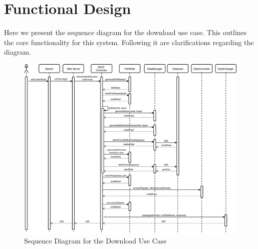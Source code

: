 \documentclass{article}
\begin{document}
\clearpage

\section{Functional Design}

Here we present the sequence diagram for the download use case. This
outlines the core functionality for this system. Following it are 
clarifications regarding the diagram. 

\begin{figure}[H]
	\begin{center}
		\caption{Sequence Diagram for the Download Use Case}
		\includegraphics[width=\textwidth]{images/sequence_diagram.pdf}
	\end{center}
\end{figure}
\end{document}
